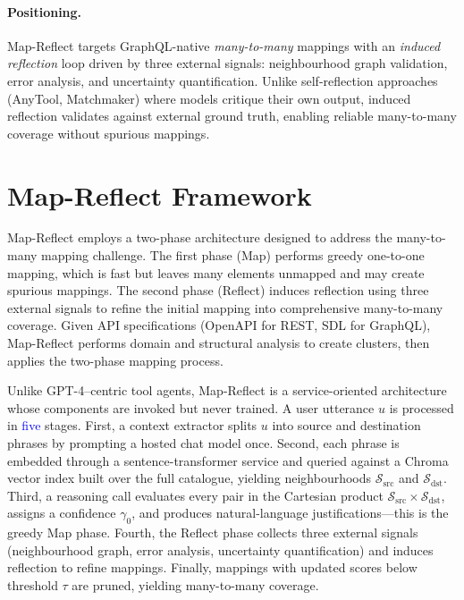 \documentclass[sigconf, nonacm]{acmart}
\newcommand{\deleted}[1]{\textcolor{red}{#1}}
\newcommand{\added}[1]{\textcolor{blue}{#1}}
\begin{document}
\paragraph{Positioning.} Map-Reflect targets GraphQL-native \emph{many-to-many} mappings with an \emph{induced reflection} loop driven by three external signals: neighbourhood graph validation, error analysis, and uncertainty quantification. Unlike self-reflection approaches (AnyTool, Matchmaker) where models critique their own output, induced reflection validates against external ground truth, enabling reliable many-to-many coverage without spurious mappings.


\section{Map-Reflect Framework}
\label{sec:mapreflect}


Map-Reflect employs a two-phase architecture designed to address the many-to-many mapping challenge. The first phase (Map) performs greedy one-to-one mapping, which is fast but leaves many elements unmapped and may create spurious mappings. The second phase (Reflect) induces reflection using three external signals to refine the initial mapping into comprehensive many-to-many coverage. Given API specifications (OpenAPI for REST, SDL for GraphQL), Map-Reflect performs domain and structural analysis to create clusters, then applies the two-phase mapping process.

Unlike GPT-4–centric tool agents, Map-Reflect is a service-oriented architecture whose components are invoked but never trained. A user utterance $u$ is processed in \added{five} stages. First, a context extractor splits $u$ into source and destination phrases by prompting a hosted chat model once. Second, each phrase is embedded through a sentence-transformer service and queried against a Chroma vector index built over the full catalogue, yielding neighbourhoods $\mathcal{S}_{\mathrm{src}}$ and $\mathcal{S}_{\mathrm{dst}}$. Third, a reasoning call evaluates every pair in the Cartesian product $\mathcal{S}_{\mathrm{src}}\times\mathcal{S}_{\mathrm{dst}}$, assigns a confidence $\gamma_0$, and produces natural-language justifications—this is the greedy Map phase. Fourth, the Reflect phase collects three external signals (neighbourhood graph, error analysis, uncertainty quantification) and induces reflection to refine mappings. Finally, mappings with updated scores below threshold $\tau$ are pruned, yielding many-to-many coverage.
\end{document}

